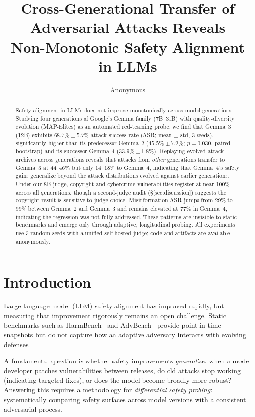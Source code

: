 \documentclass{article}
\title{Cross-Generational Transfer of Adversarial Attacks Reveals \\
Non-Monotonic Safety Alignment in LLMs}
\author{Anonymous}
\begin{document}
\maketitle

\begin{abstract}
Safety alignment in LLMs does not improve monotonically across model
generations. Studying four generations of Google's Gemma family
(7B--31B) with quality-diversity evolution (MAP-Elites) as an automated
red-teaming probe, we find that Gemma~3 (12B) exhibits
$68.7\% \pm 5.7\%$ attack success rate (ASR; mean $\pm$ std, 3 seeds),
significantly higher than its predecessor Gemma~2
($45.5\% \pm 7.2\%$; $p = 0.030$, paired bootstrap) and its successor
Gemma~4 ($33.9\% \pm 1.8\%$). Replaying evolved attack archives across
generations reveals that attacks from \emph{other} generations transfer
to Gemma~3 at 44--46\% but only 14--18\% to Gemma~4, indicating that
Gemma~4's safety gains generalize beyond the attack distributions
evolved against earlier generations. Under our 8B judge, copyright and
cybercrime vulnerabilities register at near-100\% across all
generations, though a second-judge audit (\S\ref{sec:discussion})
suggests the copyright result is sensitive to judge choice.
Misinformation ASR jumps from 29\% to 99\% between Gemma~2 and
Gemma~3 and remains elevated at 77\% in Gemma~4, indicating the
regression was not fully addressed. These patterns are invisible to
static benchmarks and emerge only through adaptive, longitudinal
probing. All experiments use 3 random seeds with a unified self-hosted
judge; code and artifacts are available anonymously.
\end{abstract}

\section{Introduction}
\label{sec:intro}

Large language model (LLM) safety alignment has improved rapidly, but
measuring that improvement rigorously remains an open challenge.
Static benchmarks such as HarmBench~\cite{mazeika2024harmbench} and
AdvBench~\cite{zou2023universal} provide point-in-time snapshots but
do not capture how an adaptive adversary interacts with evolving defenses.

A fundamental question is whether safety improvements \emph{generalize}:
when a model developer patches vulnerabilities between releases, do old
attacks stop working (indicating targeted fixes), or does the model become
broadly more robust? Answering this requires a methodology for
\emph{differential safety probing}: systematically comparing safety
surfaces across model versions with a consistent adversarial process.
\end{document}
